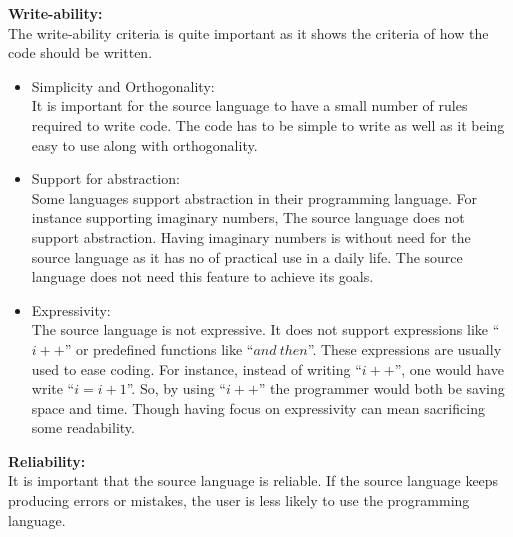 \textbf{Write-ability:} \\
The write-ability criteria is quite important as it shows the criteria of how the code should be written. 
\begin{itemize}
\item Simplicity and Orthogonality: \\
It is important for the source language to have a small number of rules required to write code. The code has to be simple to write as well as it being easy to use along with orthogonality.
\item Support for abstraction: \\
Some languages support abstraction  in their programming language. For instance supporting imaginary numbers, The source language does not support abstraction. Having imaginary numbers is without need for the source language as it has no of practical use in a daily life. The source language does not need this feature to achieve its goals.
\item Expressivity: \\
The source language is not expressive. It does not support expressions like ``$i++$'' or predefined functions like ``$and~then$''. These expressions are usually used to ease coding. For instance, instead of writing ``$i++$'', one would have write ``$i = i + 1$''. So, by using ``$i++$'' the programmer would both be saving space and time. Though having focus on expressivity can mean sacrificing some readability. 
\end{itemize}
\textbf{Reliability:} \\
It is important that the source language is reliable. If the source language keeps producing errors or mistakes, the user is less likely to use the programming language.
